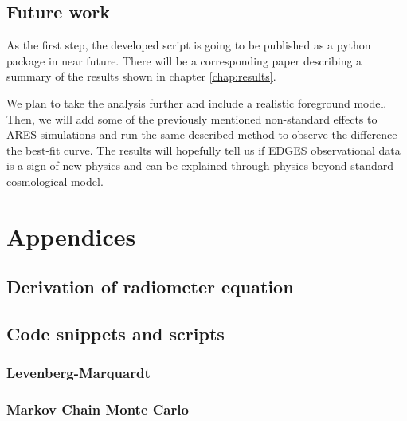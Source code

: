\documentclass[12pt, TexShade, letterpaper]{report}
\begin{document}
\section{Future work}
As the first step, the developed script is going to be published as a python package in near future. There will be a corresponding paper describing a summary of the results shown in chapter \ref{chap:results}.\par
We plan to take the analysis further and include a realistic foreground model. Then, we will add some of the previously mentioned non-standard effects to ARES simulations and run the same described method to observe the difference the best-fit curve. The results will hopefully tell us if EDGES observational data is a sign of new physics and can be explained through physics beyond standard cosmological model.\par

\chapter{Appendices}
\section{Derivation of radiometer equation}
\section{Code snippets and scripts}	
\subsection{Levenberg-Marquardt}
\label{chap:appendix,sub:LM}
\subsection{Markov Chain Monte Carlo}
\label{chap:appendix,sub:MCMC}
\end{document}
